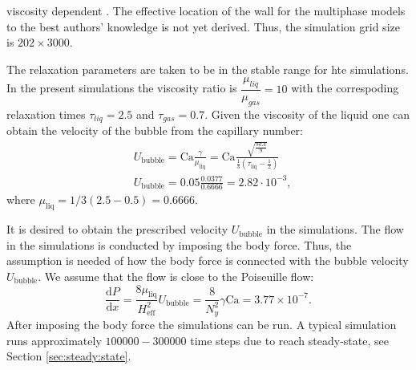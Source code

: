 \documentclass[preprint,12pt]{elsarticle}
\newcommand{\Ca}{\mathrm{Ca}}
\begin{document}
{\begin{description}
viscosity dependent \cite{ginzburg-multireflection}.  The effective location of the
wall for the
multiphase models to the best authors' knowledge is not yet derived. Thus, the simulation grid size
is $202\times 3000$. 
 \item[Velocity] The relaxation parameters are taken to be in the stable range for hte simulations.
In the present simulations the viscosity ratio is $\dfrac{\mu_{liq}}{\mu_{gas}}=10$ with the
correspoding relaxation times $\tau_{liq}=2.5$ and $\tau_{gas}=0.7$. Given the viscosity of the
liquid one can obtain the velocity of the bubble from the capillary number: 
\begin{equation}
\begin{aligned}
&U_{\mathrm{bubble}}=\Ca \frac{\gamma}{\mu_{\mathrm{liq}}}=\Ca \frac{\sqrt{\frac{8 k
A}{9}}}{\frac{1}{3}(\tau_{\mathrm{liq}}-\frac{1}{2})}\\
&U_{\mathrm{bubble}}=0.05 \frac{0.0377}{0.6666}=2.82 \cdot10^{-3},
\end{aligned}
\end{equation}
where $\mu_{\mathrm{liq}}=1/3 (2.5-0.5)=0.6666$.
\item[Body force] 
It is desired to obtain the prescribed velocity $U_{\mathrm{bubble}}$ in the simulations. The
flow in the simulations is conducted by imposing the body force. Thus, the assumption is needed of
how the body force is connected with the bubble velocity $U_{\mathrm{bubble}}$. We assume that the
flow is close to the Poiseuille flow:
\begin{equation}
\frac{\mathrm{d}P}{\mathrm{d}x}=\frac{8\mu_{\mathrm{liq}}}{H_{\mathrm{eff}}^2}
U_{\mathrm{bubble}}=\frac{8}{N_y^2}\gamma \Ca=3.77\times 10^{-7}.  
\end{equation}
After imposing the body force the simulations can be run. A typical simulation runs approximately
$100000-300000$ time steps due to reach steady-state, see Section \ref{sec:steady:state}.
\end{description}
}
\end{document}
